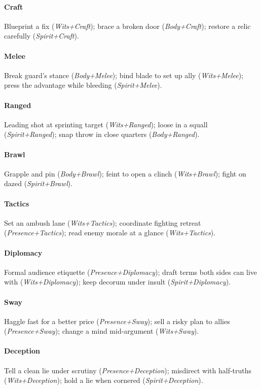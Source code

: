 \paragraph{Craft}
Blueprint a fix (\emph{Wits+Craft}); brace a broken door (\emph{Body+Craft}); restore a relic carefully (\emph{Spirit+Craft}).

\paragraph{Melee}
Break guard's stance (\emph{Body+Melee}); bind blade to set up ally (\emph{Wits+Melee}); press the advantage while bleeding (\emph{Spirit+Melee}).

\paragraph{Ranged}
Leading shot at sprinting target (\emph{Wits+Ranged}); loose in a squall (\emph{Spirit+Ranged}); snap throw in close quarters (\emph{Body+Ranged}).

\paragraph{Brawl}
Grapple and pin (\emph{Body+Brawl}); feint to open a clinch (\emph{Wits+Brawl}); fight on dazed (\emph{Spirit+Brawl}).

\paragraph{Tactics}
Set an ambush lane (\emph{Wits+Tactics}); coordinate fighting retreat (\emph{Presence+Tactics}); read enemy morale at a glance (\emph{Wits+Tactics}).

\paragraph{Diplomacy}
Formal audience etiquette (\emph{Presence+Diplomacy}); draft terms both sides can live with (\emph{Wits+Diplomacy}); keep decorum under insult (\emph{Spirit+Diplomacy}).

\paragraph{Sway}
Haggle fast for a better price (\emph{Presence+Sway}); sell a risky plan to allies (\emph{Presence+Sway}); change a mind mid‑argument (\emph{Wits+Sway}).

\paragraph{Deception}
Tell a clean lie under scrutiny (\emph{Presence+Deception}); misdirect with half‑truths (\emph{Wits+Deception}); hold a lie when cornered (\emph{Spirit+Deception}).

